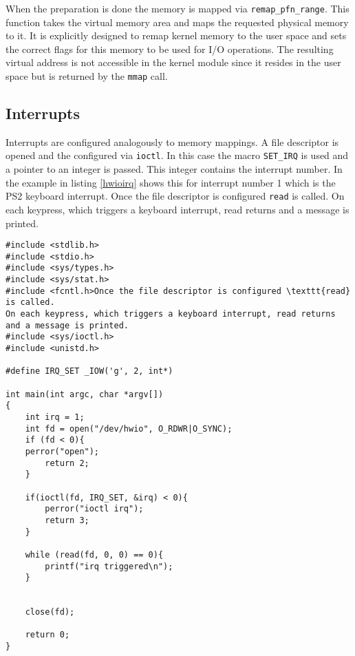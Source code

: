\documentclass[
a4paper,
12pt,
notitlepage,
parskip=half,
DIV=11,
]{scrbook}
\begin{document}
		When the preparation is done the memory is mapped via \texttt{remap\_pfn\_range}.
		This function takes the virtual memory area and maps the requested physical memory to it.
		It is explicitly designed to remap kernel memory to the user space and sets the correct flags for this memory to be used for I/O operations.
		The resulting virtual address is not accessible in the kernel module since it resides in the user space but is returned by the \texttt{mmap} call.
		
		\subsection{Interrupts}
		
		Interrupts are configured analogously to memory mappings.
		A file descriptor is opened and the configured via \texttt{ioctl}.
		In this case the macro \texttt{SET\_IRQ} is used and a pointer to an integer is passed.
		This integer contains the interrupt number.
		In the example in listing \ref{hwioirq} shows this for interrupt number 1 which is the PS2 keyboard interrupt.
		Once the file descriptor is configured \texttt{read} is called.
		On each keypress, which triggers a keyboard interrupt, read returns and a message is printed.
		
		\begin{lstlisting}[basicstyle=\ttfamily\footnotesize]
#include <stdlib.h>
#include <stdio.h>
#include <sys/types.h>
#include <sys/stat.h>
#include <fcntl.h>Once the file descriptor is configured \texttt{read} is called.
On each keypress, which triggers a keyboard interrupt, read returns and a message is printed.
#include <sys/ioctl.h>
#include <unistd.h>
		
#define IRQ_SET _IOW('g', 2, int*)

int main(int argc, char *argv[])
{  		
	int irq = 1;
	int fd = open("/dev/hwio", O_RDWR|O_SYNC);
	if (fd < 0){ 
	perror("open");
		return 2;
	}   
		
	if(ioctl(fd, IRQ_SET, &irq) < 0){ 
		perror("ioctl irq");
		return 3;
	}   
		
	while (read(fd, 0, 0) == 0){ 
		printf("irq triggered\n");
	}   
		
		
	close(fd);
		
	return 0;
}
		
		\end{lstlisting}
		
\end{document}
